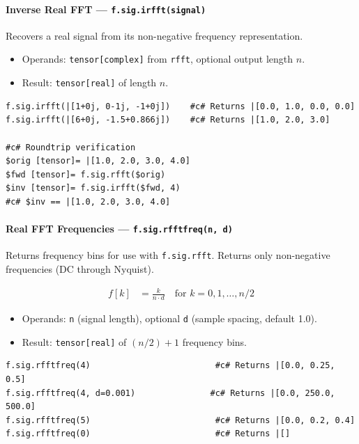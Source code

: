 \paragraph{Inverse Real FFT --- \texttt{f.sig.irfft(signal)}}
Recovers a real signal from its non-negative frequency representation.

\begin{itemize}
\item Operands: \texttt{tensor[complex]} from \texttt{rfft}, optional output length $n$.
\item Result: \texttt{tensor[real]} of length $n$.
\end{itemize}

\begin{verbatim}
f.sig.irfft(|[1+0j, 0-1j, -1+0j])    #c# Returns |[0.0, 1.0, 0.0, 0.0]
f.sig.irfft(|[6+0j, -1.5+0.866j])    #c# Returns |[1.0, 2.0, 3.0]

#c# Roundtrip verification
$orig [tensor]= |[1.0, 2.0, 3.0, 4.0]
$fwd [tensor]= f.sig.rfft($orig)
$inv [tensor]= f.sig.irfft($fwd, 4)
#c# $inv == |[1.0, 2.0, 3.0, 4.0]
\end{verbatim}

\paragraph{Real FFT Frequencies --- \texttt{f.sig.rfftfreq(n, d)}}
Returns frequency bins for use with \texttt{f.sig.rfft}. Returns only non-negative frequencies (DC through Nyquist).

\begin{align}
f[k] &= \frac{k}{n \cdot d} \quad \text{for } k = 0, 1, \ldots, n/2 \label{eq:sig-rfftfreq}
\end{align}

\begin{itemize}
\item Operands: \texttt{n} (signal length), optional \texttt{d} (sample spacing, default 1.0).
\item Result: \texttt{tensor[real]} of $(n/2)+1$ frequency bins.
\end{itemize}

\begin{verbatim}
f.sig.rfftfreq(4)                         #c# Returns |[0.0, 0.25, 0.5]
f.sig.rfftfreq(4, d=0.001)               #c# Returns |[0.0, 250.0, 500.0]
f.sig.rfftfreq(5)                         #c# Returns |[0.0, 0.2, 0.4]
f.sig.rfftfreq(0)                         #c# Returns |[]
\end{verbatim}

